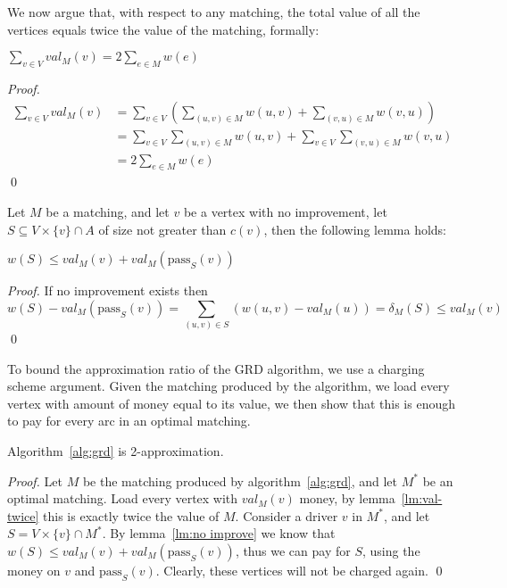 
We now argue that, with respect to any matching, 
the total value of all the vertices equals twice the value of the matching, 
formally: 
\begin{lemma}
\label{lm:val-twice}
$\sum_{v \in V} val_M(v) = 2 \sum_{e \in M} w(e)$
\end{lemma}

\begin{proof}
\begin{equation}
\begin{split}
\sum_{v \in V} val_M(v)	& = 
\sum_{v \in V} \left( \sum_{(u, v) \in M} w(u, v) + \sum_{(v, u) \in M} w(v, u) \right)	\\
						& = \sum_{v \in V}\sum_{(u, v) \in M} w(u, v) + 
							\sum_{v \in V}\sum_{(v, u) \in M} w(v, u)					\\
						& = 2 \sum_{e \in M} w(e)
\end{split}
\end{equation}
\qed\end{proof}

Let $M$ be a matching, and let $v$ be a vertex with no improvement,
let $S \subseteq V \times \{v\} \cap A$ of size not greater than $c(v)$,
then the following lemma holds:

\begin{lemma}
\label{lm:no improve}
$w(S) \leq val_M(v) + val_M(\text{pass}_S(v))$
\end{lemma}

\begin{proof}
If no improvement exists then
$$
w(S) - val_M(\text{pass}_S(v))=
\sum_{(u,v) \in S}(w(u,v) - val_M(u)) =
\delta_M(S) 
\leq val_M(v)
$$
\qed\end{proof}

To bound the approximation ratio of the GRD algorithm, 
we use a charging scheme argument.
Given the matching produced by the algorithm, 
we load every vertex with amount of money equal to its value,
we then show that this is enough to pay for every arc in an optimal matching.   

\begin{theorem}
Algorithm~\ref{alg:grd} is 2-approximation.
\end{theorem}

\begin{proof}
Let $M$ be the matching produced by algorithm~\ref{alg:grd}, 
and let $M^*$ be an optimal matching.
Load every vertex with $val_M(v)$ money, 
by lemma~\ref{lm:val-twice} this is exactly twice the value of $M$.
Consider a driver $v$ in $M^*$, and let $S = V \times \{v\} \cap M^*$.
By lemma~\ref{lm:no improve} we know that $w(S) \leq val_M(v) + val_M(\text{pass}_S(v))$,
thus we can pay for $S$, using the money on $v$ and $\text{pass}_S(v)$.
Clearly, these vertices will not be charged again.
\qed\end{proof}

